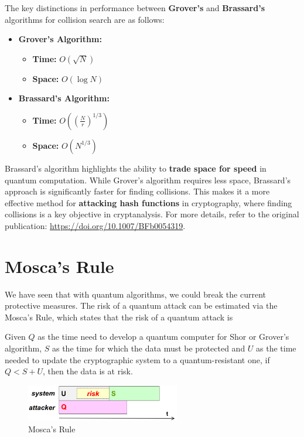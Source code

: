 The key distinctions in performance between \textbf{Grover's} and
\textbf{Brassard's} algorithms for collision search are as follows:
\begin{itemize}
  \item \textbf{Grover's Algorithm:} 
    \begin{itemize}
      \item \textbf{Time:} \(O(\sqrt{N})\)
      \item \textbf{Space:} \(O(\log N)\)
    \end{itemize}
  \item \textbf{Brassard's Algorithm:} 
    \begin{itemize}
      \item \textbf{Time:}
        \(O\left(\left(\frac{N}{r}\right)^{1/3}\right)\)
      \item \textbf{Space:} \(O(N^{1/3})\)
    \end{itemize}
\end{itemize}

Brassard's algorithm highlights the ability to \textbf{trade space for
speed} in quantum computation. While Grover's algorithm requires less
space, Brassard's approach is significantly faster for finding
collisions. This makes it a more effective method for
\textbf{attacking hash functions} in cryptography, where finding
collisions is a key objective in cryptanalysis. For more details,
refer to the original publication:
\url{https://doi.org/10.1007/BFb0054319}.

\section{Mosca's Rule}
We have seen that with quantum algorithms, we could break the current 
protective measures. The risk of a quantum attack can be estimated via
the Mosca's Rule, which states that the risk of a quantum attack is

Given $Q$ as the time need  to develop a quantum computer for Shor or
Grover's algorithm, $S$ as the time for which the data must be 
protected and $U$ as the time needed to update the cryptographic 
system to a quantum-resistant one, if $Q < S + U$, then the data is at 
risk.

\begin{figure}[H]
  \centering
  \includegraphics[width=0.6\textwidth]{img/mosca rule.png}
  \caption{Mosca's Rule}
\end{figure}


